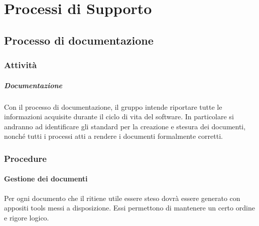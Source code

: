 %


\section{Processi di Supporto}

	\subsection{Processo di documentazione}
	
		\subsubsection{Attività}

			\subparagraph{Documentazione}
			Con il processo di documentazione, il gruppo \groupName{} intende riportare tutte le informazioni acquisite durante il ciclo di vita del software.
			In particolare si andranno ad identificare gli standard per la creazione e stesura dei documenti, nonché tutti i processi atti a rendere i documenti formalmente corretti.


		\subsubsection{Procedure}

			\paragraph{Gestione dei documenti}
			Per ogni documento che il \roleProjectManager{} ritiene utile essere steso dovrà essere generato con appositi tools messi a disposizione. Essi permettono di mantenere un certo ordine e rigore logico.  

